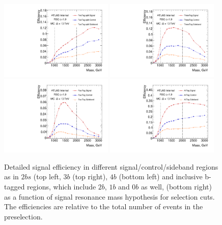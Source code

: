\begin{figure}
\begin{center}
\includegraphics[width=0.48\textwidth,angle=-90]{figures/boosted/SigEff/region_2b_lst_Moriond_Efficiency_PreSel.pdf}
\includegraphics[width=0.48\textwidth,angle=-90]{figures/boosted/SigEff/region_3b_lst_Moriond_Efficiency_PreSel.pdf} \\
\includegraphics[width=0.48\textwidth,angle=-90]{figures/boosted/SigEff/region_4b_lst_Moriond_Efficiency_PreSel.pdf}
\includegraphics[width=0.48\textwidth,angle=-90]{figures/boosted/SigEff/region_alltag_lst_Moriond_Efficiency_PreSel.pdf} \\
  \caption{Detailed signal efficiency in different signal/control/sideband regions as in $2bs$ (top left, $3b$ (top right), $4b$ (bottom left) and inclusive b-tagged regions, which include $2b$, $1b$ and 0$b$ as well, (bottom right) as a function of signal resonance mass hypothesis for selection cuts. The efficiencies are relative to the total number of events in the preselection.}
  \label{fig:boosted-selection-region-efficiency}
\end{center}
\end{figure}



